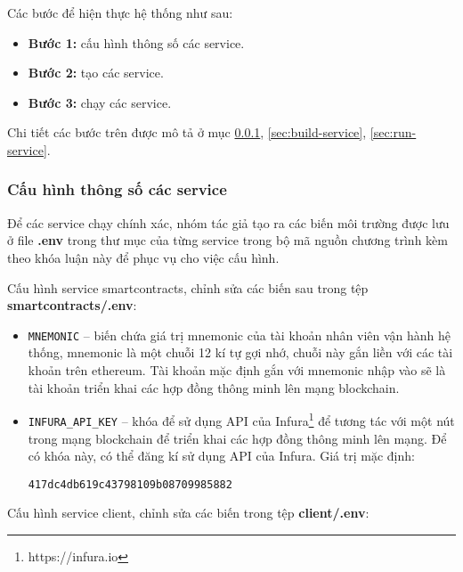 \documentclass[../main-report.tex]{subfiles}
\begin{document}
Các bước để hiện thực hệ thống như sau:

\begin{itemize}
\item \textbf{Bước 1:} cấu hình thông số các \gls{service}.
\item \textbf{Bước 2:} tạo các \gls{service}.
\item \textbf{Bước 3:} chạy các \gls{service}.
\end{itemize}

Chi tiết các bước trên được mô tả ở mục \ref{sec:configure-service}, \ref{sec:build-service}, \ref{sec:run-service}.

\subsubsection{Cấu hình thông số các service}
\label{sec:configure-service}
Để các service chạy chính xác, nhóm tác giả tạo ra các biến môi trường được lưu ở file \textbf{.env} trong thư mục của từng service trong bộ mã nguồn chương trình kèm theo khóa luận này để phục vụ cho việc cấu hình.

Cấu hình service smartcontracts, chỉnh sửa các biến sau trong tệp \textbf{smartcontracts/.env}:

\begin{itemize}
\item \texttt{MNEMONIC} -- biến chứa giá trị mnemonic của tài khoản nhân viên vận hành hệ thống, mnemonic là một chuỗi 12 kí tự gợi nhớ, chuỗi này gắn liền với các tài khoản trên ethereum. Tài khoản mặc định gắn với mnemonic nhập vào sẽ là tài khoản triển khai các hợp đồng thông minh lên mạng blockchain.
\item \texttt{INFURA\_API\_KEY} -- khóa để sử dụng API của Infura\footnote{https://infura.io} để tương tác với một nút trong mạng blockchain để triển khai các hợp đồng thông minh lên mạng. Để có khóa này, có thể đăng kí sử dụng API của Infura. Giá trị mặc định: 

\begin{lstlisting}
417dc4db619c43798109b08709985882
\end{lstlisting}
\end{itemize}

Cấu hình service client, chỉnh sửa các biến trong tệp \textbf{client/.env}:
\end{document}
